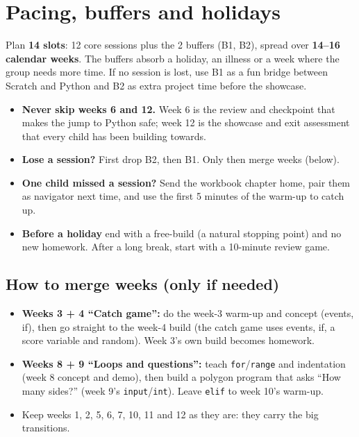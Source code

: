 \documentclass[level=1,teacher]{kidscode}
\begin{document}
\section{Pacing, buffers and holidays}
Plan \textbf{14 slots}: 12 core sessions plus the 2 buffers (B1, B2), spread over \textbf{14--16 calendar weeks}.
The buffers absorb a holiday, an illness or a week where the group needs more time. If no session
is lost, use B1 as a fun bridge between Scratch and Python and B2 as extra project time before the showcase.

\begin{tip}
\begin{itemize}[itemsep=2pt]
  \item \textbf{Never skip weeks 6 and 12.} Week 6 is the review and checkpoint that makes the jump to
        Python safe; week 12 is the showcase and exit assessment that every child has been building towards.
  \item \textbf{Lose a session?} First drop B2, then B1. Only then merge weeks (below).
  \item \textbf{One child missed a session?} Send the workbook chapter home, pair them as navigator next
        time, and use the first 5 minutes of the warm-up to catch up.
  \item \textbf{Before a holiday} end with a free-build (a natural stopping point) and no new homework.
        After a long break, start with a 10-minute review game.
\end{itemize}
\end{tip}

\subsection{How to merge weeks (only if needed)}
\begin{itemize}[itemsep=3pt]
  \item \textbf{Weeks 3 + 4 \enquote{Catch game}:} do the week-3 warm-up and concept (events, if), then go straight
        to the week-4 build (the catch game uses events, if, a score variable and random). Week 3's own build
        becomes homework.
  \item \textbf{Weeks 8 + 9 \enquote{Loops and questions}:} teach \texttt{for}/\texttt{range} and indentation (week 8
        concept and demo), then build a polygon program that asks \enquote{How many sides?} (week 9's
        \texttt{input}/\texttt{int}). Leave \texttt{elif} to week 10's warm-up.
  \item Keep weeks 1, 2, 5, 6, 7, 10, 11 and 12 as they are: they carry the big transitions.
\end{itemize}
\end{document}
